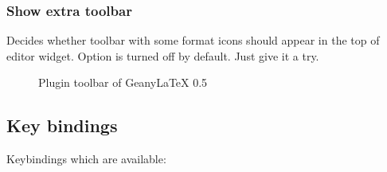 \documentclass[%
a4paper,%
10pt,%
oneside,%
DIV18,
headsepline,
plainheadsepline,
footsepline,
plainfootsepline,
bibtotoc,%
liststotoc,%
BCOR12mm,%
halfparskip,%
openany,%
]{scrartcl}
\begin{document}
\subsubsection{Show extra toolbar}
Decides whether toolbar with some format icons should appear in the top
of editor widget. Option is turned off by default. Just give it a try.

\begin{figure}[h!]
	\caption{Plugin toolbar of Geany\LaTeX{} 0.5}
\end{figure}

\subsection{Key bindings}
Keybindings which are available:
\end{document}
